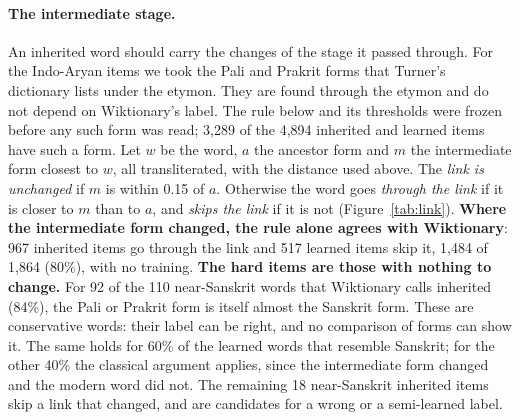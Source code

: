 \documentclass[11pt]{article}
\begin{document}
\paragraph{The intermediate stage.} An inherited word should carry the changes of the stage it passed through. For the Indo-Aryan items we took the Pali and Prakrit forms that Turner's dictionary lists under the etymon. They are found through the etymon and do not depend on Wiktionary's label. The rule below and its thresholds were frozen before any such form was read; 3,289 of the 4,894 inherited and learned items have such a form. Let $w$ be the word, $a$ the ancestor form and $m$ the intermediate form closest to $w$, all transliterated, with the distance used above. The \textit{link is unchanged} if $m$ is within 0.15 of $a$. Otherwise the word goes \textit{through the link} if it is closer to $m$ than to $a$, and \textit{skips the link} if it is not (Figure~\ref{tab:link}). \textbf{Where the intermediate form changed, the rule alone agrees with Wiktionary}: 967 inherited items go through the link and 517 learned items skip it, 1,484 of 1,864 (80\%), with no training. \textbf{The hard items are those with nothing to change.} For 92 of the 110 near-Sanskrit words that Wiktionary calls inherited (84\%), the Pali or Prakrit form is itself almost the Sanskrit form. These are conservative words: their label can be right, and no comparison of forms can show it. The same holds for 60\% of the learned words that resemble Sanskrit; for the other 40\% the classical argument applies, since the intermediate form changed and the modern word did not. The remaining 18 near-Sanskrit inherited items skip a link that changed, and are candidates for a wrong or a semi-learned label.
\end{document}
